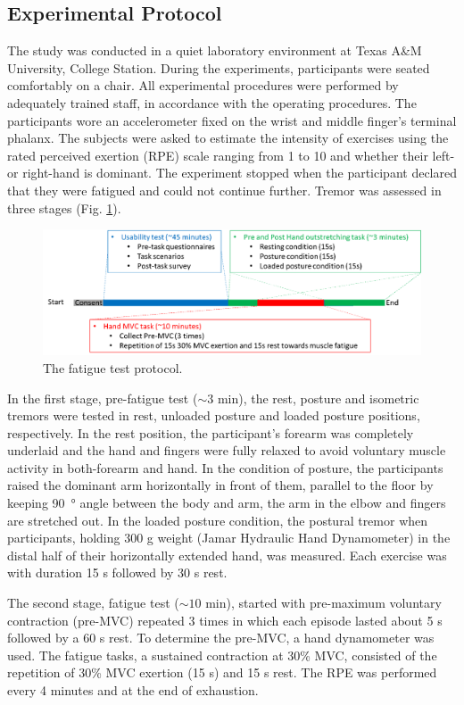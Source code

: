 \documentclass[conference, a4paper]{IEEEtran}
\begin{document}
\subsection{Experimental Protocol}
%
The study was conducted in a quiet laboratory environment at Texas A\&M University, College Station. During the experiments, participants were seated comfortably on a chair. All experimental procedures were performed by adequately trained staff, in accordance with the operating procedures. The participants wore an accelerometer fixed on the wrist and middle finger's terminal phalanx. The subjects were asked to estimate the intensity of exercises using the rated perceived exertion (RPE) scale ranging from 1 to 10 and whether their left- or right-hand is dominant. The experiment stopped when the participant declared that they were fatigued and could not continue further.
Tremor was assessed in three stages (Fig. \ref{fig:protocol}).
%
\begin{figure}[t!]
  \centering
  \includegraphics[width=5.2in]{protocol.png}
  \caption{The fatigue test protocol.}
  \label{fig:protocol}
\end{figure}

In the first stage, pre-fatigue test ($\sim 3$ min), the rest, posture and isometric tremors were tested in rest, unloaded posture and loaded posture positions, respectively. In the rest position, the participant's forearm was completely underlaid and the hand and fingers were fully relaxed to avoid voluntary muscle activity in both-forearm and hand. In the condition of posture, the participants raised the dominant arm horizontally in front of them, parallel to the floor by keeping \SI{90}{\degree} angle between the body and arm, the arm in the elbow and fingers are stretched out. In the loaded posture condition, the postural tremor when participants, holding 300 g weight (Jamar Hydraulic Hand Dynamometer) in the distal half of their horizontally extended hand, was measured. Each exercise was with duration 15 s followed by 30 s rest.

The second stage, fatigue test ($\sim 10$ min), started with pre-maximum voluntary contraction (pre-MVC) repeated 3 times in which each episode lasted about 5 s followed by a 60 s rest. To determine the pre-MVC, a hand dynamometer was used. The fatigue tasks, a sustained contraction at 30\% MVC, consisted of the repetition of 30\% MVC exertion (15 s) and 15 s rest. The RPE was performed every 4 minutes and at the end of exhaustion.
\end{document}
